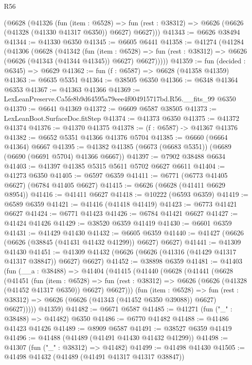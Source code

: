\begin{lexlean}{R56}
\begin{coremodule}
    (@6628
      (@41326
        (fun (item : @6528) =>
        fun (rest : @38312) => @6626 (@6626 (@41328 (@41330 @41317 @6350)) @6627) @6627)))
@41343 := @6626 @38494
@41344 := @41330 @6350
@41345 := @6605 @6441
@41358 := @41274
    (@41284
      (@41306
        (@6628
          (@41342
            (fun (item : @6528) =>
            fun (rest : @38312) => @6626 (@6626 (@41343 (@41344 @41345)) @6627) @6627)))))
@41359 := fun (decided : @6345) => @6629
@41362 := fun (f : @6587) => @6628 (@41358 @41359)
@41363 := @6635 @5351
@41364 := @38505 @6350
@41366 := @6348 @41364 @6353
@41367 := @41363 @41366
@41369 := LexLeanPreserve.Ca5fe8b9d64595a79eee4f004915717bd.R56.__fits_99 @6350
@41370 := @6641 @41369
@41372 := @6609 @6587 @38505
@41373 := LexLeanBoot.SurfaceDoc.fitStep
@41374 := @41373 @6350
@41375 := @41372 @41374
@41376 := @41370 @41375
@41378 := (f : @6587) -> @41367 @41376
@41382 := @6652 @5351 @41366 @41376 @5704
@41385 := @6660 (@6664 @41364) @6667
@41395 := @41382 @41385 (@6673 (@6683 @5351)) (@6689 (@6690 (@6691 @5704) @41366 @6667))
@41397 := @7902 @38488 @6634
@41403 := @41397 @41385 @5315 @5611 @5702 @6627 @6611
@41404 := @41273 @6350
@41405 := @6597 @6359
@41411 := @6771 (@6773 @41405 @6627) (@6784 @41405 @6627)
@41415 := @6626 (@6628 (@41411 @6629 @8954))
@41416 := @41411 @6627
@41418 := @10222 (@6593 @6359)
@41419 := @6589 @6359
@41421 := @41416 (@41418 @41419)
@41423 := @6773 @41421 @6627
@41424 := @6771 @41423
@41426 := @6784 @41421 @6627
@41427 := @41424 @41426
@41429 := @38520 @6359 @41419
@41430 := @6601 @6359
@41431 := @41429 @41430
@41432 := @6605 @6359
@41440 := @41427 (@6626 (@6626 (@38845 (@41431 @41432 @41299)) @6627) @6627)
@41441 := @41309 @41430
@41451 := @41309 @41432 (@6626 (@6626 (@41316 (@41429 @41317 @41317 @38847)) @6627) @6627)
@41452 := @38898 @6359
@41481 := @41403
    (fun (__a : @38488) =>
    @41404
      (@41415
        (@41440
          (@6628
            (@41441
              (@6628
                (@41451
                  (fun (item : @6528) =>
                  fun (rest : @38312) => @6626 (@6626 (@41328 (@41452 @41317 @6350)) @6627) @6627)))
              (fun (item : @6528) =>
              fun (rest : @38312) => @6626 (@6626 (@41343 (@41452 @6350 @39088)) @6627) @6627)))))
      @41359)
@41482 := @6671 @6587
@41485 := @41271 (fun ("_" : @38488) => @41482) @6350
@41486 := @6770 @41482
@41488 := @41486 @41423 @41426
@41489 := @8909 @6587
@41491 := @38527 @6359 @41419
@41496 := @41488 (@41489 (@41491 @41430 @41432 @41299))
@41498 := @41307 (fun ("_" : @38312) => @41482)
@41499 := @41498 @41430
@41505 := @41498 @41432 (@41489 (@41491 @41317 @41317 @38847))

\end{coremodule}
\end{lexlean}
